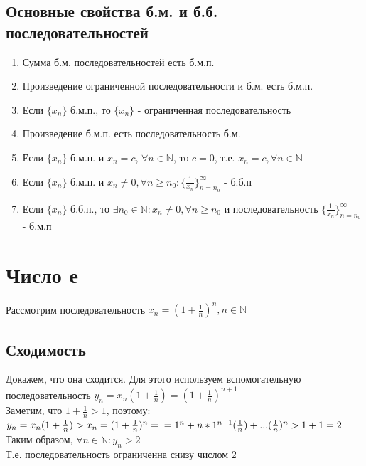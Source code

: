 \documentclass[oneside]{book}
\begin{document}
\begin{enumerate}
\section{Основные свойства б.м. и б.б. последовательностей}
\begin{enumerate}
\item Сумма б.м. последовательностей есть б.м.п.
\item Произведение ограниченной последовательности и б.м. есть б.м.п.
\item Если $\{x_n\}$ б.м.п., то $\{x_n\}$ - ограниченная последовательность
\item Произведение б.м.п. есть последовательность б.м.
\item Если $\{x_n\}$ б.м.п. и $x_n = c$, $\forall n \in \mathbb{N}$, то $c=0$, т.е. $x_n = c,  \forall n \in
\mathbb{N}$
\item Если $\{x_n\}$ б.м.п. и $x_n \neq 0,  \forall n\geq n_0: \{\frac{1}{x_n}\}^\infty_{n=n_0}$ - б.б.п
\item Если $\{x_n\}$ б.б.п., то $\exists n_0 \in \mathbb{N}:x_n \neq 0,  \forall n\geq n_0$ и последовательность $ \{\frac{1}{x_n}\}^\infty_{n=n_0}$ - б.м.п
\end{enumerate}



\setcounter{chapter}{7}
\chapter{Число е}
Рассмотрим последовательность $x_n=(1+\frac{1}{n})^n, n \in \mathbb{N}$\\
\section{Сходимость}
Докажем, что она сходится. Для этого используем вспомогательную последовательность
$y_n=x_n(1+\frac{1}{n})=(1+\frac{1}{n})^{n+1}$\\
Заметим, что $1+\frac{1}{n}>1$, поэтому:\\ $y_n=x_n(1+\frac{1}{n})>x_n=(1+\frac{1}{n})^n=\\=1^n+n*1^{n-1}(\frac{1}{n})+...(\frac{1}{n})^n>1+1=2$
\\Таким образом, $\forall n \in \mathbb{N} :y_n>2$
\\Т.е. последовательность ограниченна снизу числом 2

\end{enumerate}
\end{document}
